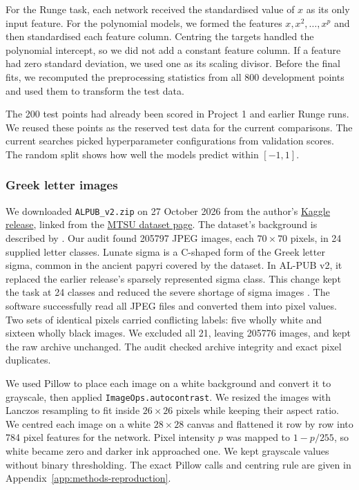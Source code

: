 For the Runge task, each network received the standardised value of $x$
as its only input feature. For the polynomial models, we formed the features
$x,x^2,\ldots,x^p$ and then standardised each feature column. Centring the
targets handled the polynomial intercept, so we did not add a constant
feature column. If a feature had zero standard deviation, we used one as
its scaling divisor. Before the final fits, we recomputed the preprocessing
statistics from all 800 development points and used them to transform
the test data.

The 200 test points had already been scored in Project 1 and earlier
Runge runs. We reused these points as the reserved test data for the current comparisons. The current searches picked hyperparameter configurations from validation scores.
The random split shows how well the models predict within $[-1,1]$.

\subsubsection{Greek letter images}
We downloaded \nolinkurl{ALPUB_v2.zip} on 27 October 2026 from the author's
\href{https://www.kaggle.com/datasets/miswindall/al-pub-v2}{Kaggle release},
linked from the \href{https://data.cs.mtsu.edu/al-pub/}{MTSU dataset page}.
The dataset's background is described by
\textcite{swindall2021greek}. Our audit found 205797 JPEG images, each
$70\times70$ pixels, in 24 supplied letter classes.
Lunate sigma is a C-shaped form of the Greek letter sigma, common in
the ancient papyri covered by the dataset. In AL-PUB v2, it replaced
the earlier release's sparsely represented sigma class. This change kept
the task at 24 classes and reduced the severe shortage of sigma images
\parencite[Sec.~7.3]{swindall2024papyrology}.
The software successfully read all JPEG files and converted them into pixel values. Two sets of identical pixels carried conflicting
labels: five wholly white and sixteen wholly black images. We excluded
all 21, leaving 205776 images, and kept the raw archive unchanged.
The audit checked archive integrity and exact pixel duplicates.

We used Pillow to place each image on a white background and convert it
to grayscale, then applied \nolinkurl{ImageOps.autocontrast}. We resized the images with Lanczos resampling to fit inside $26\times26$ pixels while
keeping their aspect ratio. We centred each image on a white $28\times28$ canvas and flattened it
row by row into 784 pixel features for the network. Pixel intensity $p$ was
mapped to $1-p/255$, so white became zero and darker ink approached one.
We kept grayscale values without binary thresholding. The exact Pillow
calls and centring rule are given in Appendix~\ref{app:methods-reproduction}.

